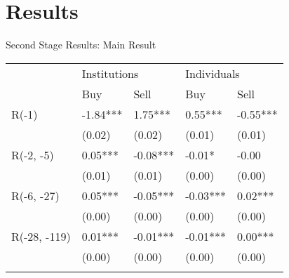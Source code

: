 \documentclass{beamer}
\begin{document}
\section{Results}



\begin{frame}{Second Stage Results: Main Result}

    {\fontsize{10}{13} \selectfont

        \begin{tabular}{l*{4}{l}}
                               & \multicolumn{2}{l}{Institutions} & \multicolumn{2}{l}{Individuals}                         \\
            \cmidrule(l){2-3} \cmidrule(l){4-5}
                               & Buy                              & Sell                            & Buy       & Sell      \\
            \midrule
            R(-1)              & -1.84***                         & 1.75***                         & 0.55***   & -0.55***  \\
                               & (0.02)                           & (0.02)                          & (0.01)    & (0.01)    \\
            R(-2, -5)          & 0.05***                          & -0.08***                        & -0.01*    & -0.00     \\
                               & (0.01)                           & (0.01)                          & (0.00)    & (0.00)    \\
            R(-6, -27)         & 0.05***                          & -0.05***                        & -0.03***  & 0.02***   \\
                               & (0.00)                           & (0.00)                          & (0.00)    & (0.00)    \\
            R(-28, -119)       & 0.01***                          & -0.01***                        & -0.01***  & 0.00***   \\
                               & (0.00)                           & (0.00)                          & (0.00)    & (0.00)    \\
                               &                                  &                                 &           &           \\

\end{tabular}}
\end{frame}
\end{document}
